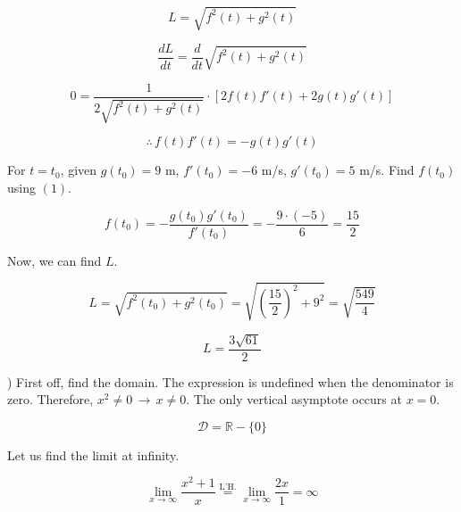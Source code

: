 \documentclass{article}
\begin{document}
\begin{equation*}L = \sqrt{f^2(t) + g^2(t)}\end{equation*}

\begin{equation*}\frac{dL}{dt} = \frac{d}{dt}\sqrt{f^2(t) + g^2(t)}\end{equation*}

\begin{equation*}0 = \frac{1}{2\sqrt{f^2(t)+g^2(t)}} \cdot [2f(t)f'(t) + 2g(t)g'(t)]\end{equation*}

\begin{equation}\therefore \, f(t)f'(t) = -g(t)g'(t)\end{equation}

\hfill

\noindent For $t=t_0$, given $g(t_0) = 9$ m, $f'(t_0) = -6$ m/s, $g'(t_0) = 5$ m/s. Find $f(t_0)$ using $(1)$.

\begin{equation*}f(t_0) = -\frac{g(t_0)g'(t_0)}{f'(t_0)} = -\frac{9\cdot (-5)}{6} = \frac{15}{2}\end{equation*}

\noindent Now, we can find $L$.

\begin{equation*}L =\sqrt{f^2(t_0) + g^2(t_0)} = \sqrt{\left(\frac{15}{2}\right)^2 + 9^2} = \sqrt{\frac{549}{4}}\end{equation*}

\hfill

\begin{equation*}\boxed{L=\frac{3\sqrt{61}}{2}}\end{equation*}

\hfill

) First off, find the domain. The expression is undefined when the denominator is zero. Therefore, $x^2 \neq 0 \,\rightarrow\, x\neq0$. The only vertical asymptote occurs at $x = 0$.

\begin{equation*}\mathcal{D} = \mathbb{R} - \{0\} \end{equation*}

\hfill

\noindent Let us find the limit at infinity.

\begin{equation*}\lim_{x\to \infty} \frac{x^2+1}{x} \overset{\text{L'H.}}{=} \lim_{x\to \infty} \frac{2x}{1} = \infty\end{equation*}
\end{document}
